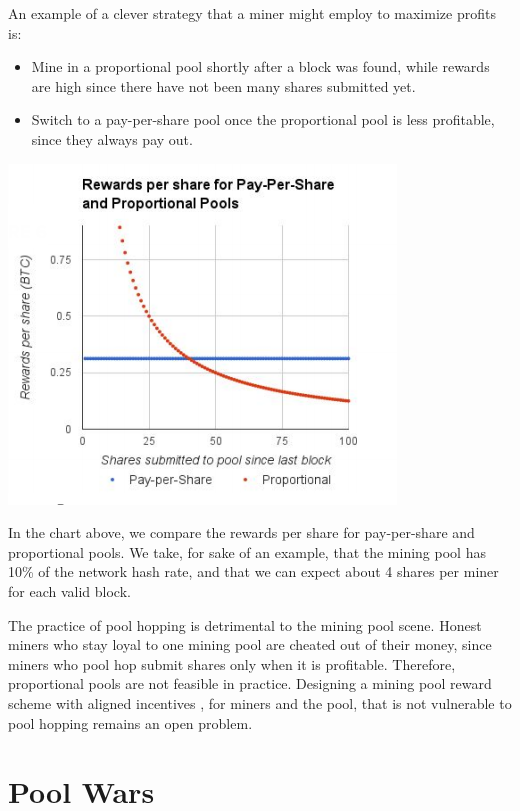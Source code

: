 \documentclass[full.tex]{subfiles}
\begin{document}
    An example of a clever strategy that a miner might employ to maximize profits is:
    
    \begin{itemize}
        \item Mine in a proportional pool shortly after a block was found, while rewards are high since there have not been many shares submitted yet.
        \item Switch to a pay-per-share pool once the proportional pool is less profitable, since they always pay out. 
    \end{itemize}
    
        \includegraphics[scale=1]{pool_hopping}
    
    \begin{center}
    \end{center}

    
    In the chart above, we compare the rewards per share for pay-per-share and proportional pools. We take, for sake of an example, that the mining pool has 10\% of the network hash rate, and that we can expect about 4 shares per miner for each valid block.

    The practice of pool hopping is detrimental to the mining pool scene. Honest miners who stay loyal to one mining pool are cheated out of their money, since miners who pool hop submit shares only when it is profitable. Therefore, proportional pools are not feasible in practice. Designing a mining pool reward scheme with aligned incentives , for miners and the pool, that is not vulnerable to pool hopping remains an open problem. 
    
    \section*{Pool Wars}
    
\end{document}
